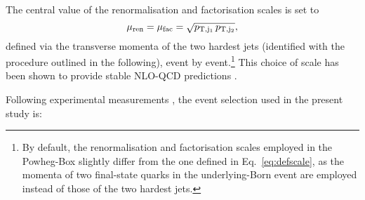 The central value of the renormalisation and factorisation scales is set to 
%
\begin{equation}
\label{eq:defscale}
 \mu_{\rm ren} = \mu_{\rm fac} = \sqrt{p_{\rm T, j_1}\, p_{\rm T, j_2}}, 
\end{equation}
%
defined via the transverse momenta of the two hardest jets (identified with the procedure outlined in the following), 
event by event.\footnote{By default, the renormalisation and factorisation scales employed in the {\sc Powheg-Box} slightly differ from the 
    one defined in Eq.~\eqref{eq:defscale}, as the momenta of two final-state quarks in the underlying-Born event are
    employed instead of those of the two hardest jets.\label{foot:powheg}} 
This choice of scale has been shown to provide stable NLO-QCD predictions \cite{Denner:2012dz}.

Following experimental measurements \cite{Aad:2014zda,Aaboud:2016ffv,Khachatryan:2014sta,CMS:2017adb}, the event selection used in the present study is:

